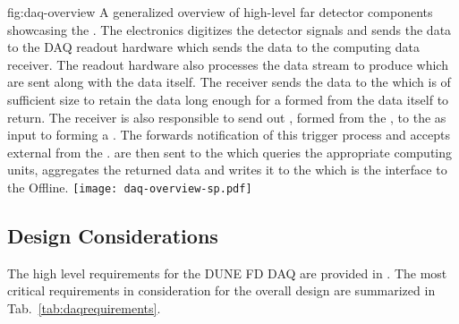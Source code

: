 \begin{dunefigure}{fig:daq-overview}
  {A generalized overview of high-level far detector 
    components showcasing the  . 
    The electronics digitizes the detector signals and sends the data
    to the DAQ  readout hardware which sends the data to the
     computing data receiver.
    The  readout hardware also processes the data stream to
    produce  which are sent along with the data
    itself.
    The receiver sends the data to the  which is of
    sufficient size to retain the data long enough for a
     formed from the data itself to return.
    The receiver is also responsible to send out
    , formed from the , to
    the  as input to forming a . 
    The  forwards notification of this trigger process and
    accepts external  from the .
     are then sent to the  which queries
    the appropriate  computing units, aggregates the
    returned data and writes it to the  which is the
    interface to the Offline.}
\texttt{[image: daq-overview-sp.pdf]}%
\end{dunefigure}



\subsection{Design Considerations}
\label{sec:fdsp-daq-des-consid}


The high level requirements for the DUNE FD DAQ are provided in
\cite{daq:reqs}.
The most critical requirements in consideration for the overall design
are summarized in Tab.~\ref{tab:daqrequirements}.

